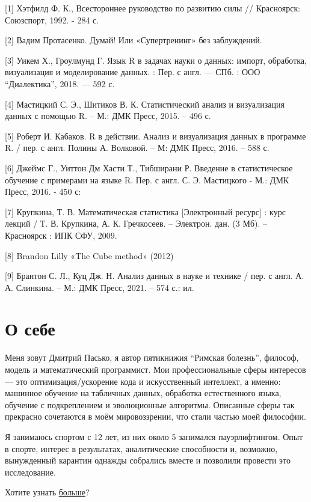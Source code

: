 \documentclass[
]{article}
\begin{document}
{[}1{]} Хэтфилд Ф. К., Всестороннее руководство по развитию силы //
Красноярск: Союзспорт, 1992. - 284 с.

{[}2{]} Вадим Протасенко. Думай! Или «Супертренинг» без заблуждений.

{[}3{]} Уикем Х., Гроулмунд Г. Язык R в задачах науки о данных: импорт,
обработка, визуализация и моделирование данных. : Пер. с англ. --- СПб.
: ООО ``Диалектика'', 2018. --- 592 с.

{[}4{]} Мастицкий С. Э., Шитиков В. К. Статистический анализ и
визуализация данных с помощью R. -- М.: ДМК Пресс, 2015. -- 496 с.

{[}5{]} Роберт И. Кабаков. R в действии. Анализ и визуализация данных в
программе R. / пер. с англ. Полины А. Волковой. -- М: ДМК Пресс, 2016.
-- 588 с.

{[}6{]} Джеймс Г., Уиттон Дм Хасти Т., Тибширани Р. Введение в
статистическое обучение с примерами на языке R. Пер. с англ. С. Э.
Мастицкого - М.: ДМК Пресс, 2016. - 450 с:

{[}7{]} Крупкина, Т. В. Математическая статистика {[}Электронный
ресурс{]} : курс лекций / Т. В. Крупкина, А. К. Гречкосеев. -- Электрон.
дан. (3 Мб). -- Красноярск : ИПК СФУ, 2009.

{[}8{]} Brandon Lilly «The Cube method» (2012)

{[}9{]} Брантон С. Л., Куц Дж. Н. Анализ данных в науке и технике / пер.
с англ. А. А. Слинкина. -- М.: ДМК Пресс, 2021. -- 574 с.: ил.

\hypertarget{ux43e-ux441ux435ux431ux435}{%
\section{О себе}\label{ux43e-ux441ux435ux431ux435}}

Меня зовут Дмитрий Пасько, я автор пятикнижия ``Римская болезнь'',
философ, модель и математический программист. Мои профессиональные сферы
интересов --- это оптимизация/ускорение кода и искусственный интеллект,
а именно: машинное обучение на табличных данных, обработка естественного
языка, обучение с подкреплением и эволюционные алгоритмы. Описанные
сферы так прекрасно сочетаются в моём мировоззрении, что стали частью
моей философии.

Я занимаюсь спортом с 12 лет, из них около 5 занимался пауэрлифтингом.
Опыт в спорте, интерес в результатах, аналитические способности и,
возможно, вынужденный карантин однажды собрались вместе и позволили
провести это исследование.

Хотите узнать
\href{https://github.com/PasaOpasen/PasaOpasen.github.io}{больше}?
\end{document}
